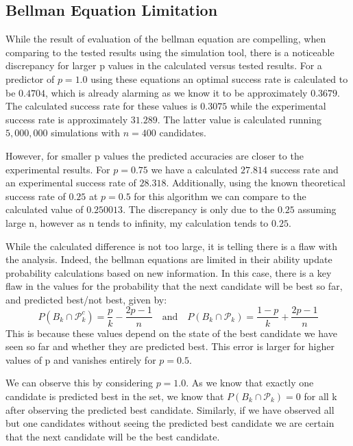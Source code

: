\documentclass[a4paper,11pt]{article}
\begin{document}
\subsection{Bellman Equation Limitation}
\label{sec:limitations}

While the result of evaluation of the bellman equation are compelling, when comparing to the tested results using the simulation tool, there is a noticeable discrepancy for larger p values in the calculated versus tested results. For a predictor of $p = 1.0$ using these equations an optimal success rate is calculated to be $0.4704$, which is already alarming as we know it to be approximately $0.3679$. The calculated success rate for these values is  $0.3075$ while the experimental success rate is approximately $31.289$. The latter value is calculated running $5,000,000$ simulations with $n=400$ candidates.

However, for smaller p values the predicted accuracies are closer to the experimental results. For $p=0.75$ we have a calculated $27.814$ success rate and an experimental success rate of $28.318$. Additionally, using the known theoretical success rate of $0.25$ at $p=0.5$ for this algorithm we can compare to the calculated value of $0.250013$. The discrepancy is only due to the $0.25$ assuming large n, however as n tends to infinity, my calculation tends to $0.25$.

While the calculated difference is not too large, it is telling there is a flaw with the analysis. Indeed, the bellman equations are limited in their ability update probability calculations based on new information. In this case, there is a key flaw in the values for the probability that the next candidate will be best so far, and predicted best/not best, given by: 
$$
P(B_{k} \cap \mathcal{P}_{k}^c) = \frac{p}{k} - \frac{2p-1}{n} \quad \text{and} \quad P(B_{k} \cap \mathcal{P}_{k})=\frac{1-p}{k} + \frac{2p-1}{n}
$$
This is because these values depend on the state of the best candidate we have seen so far and whether they are predicted best. This error is larger for higher values of p and vanishes entirely for $p = 0.5$.

We can observe this by considering $p=1.0$. As we know that exactly one candidate is predicted best in the set, we know that $P(B_{k} \cap \mathcal{P}_{k}) = 0$ for all k after observing the predicted best candidate. Similarly, if we have observed all but one candidates without seeing the predicted best candidate we are certain that the next candidate will be the best candidate.
\end{document}
